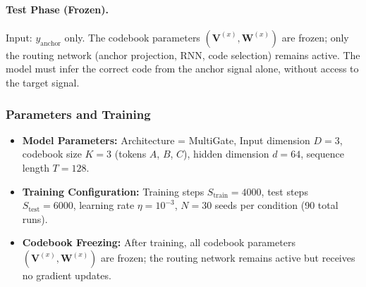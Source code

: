 \documentclass{article}
\begin{document}
\paragraph{Test Phase (Frozen).}
Input: $y_{\text{anchor}}$ only.
The codebook parameters $(\mathbf{V}^{(x)}, \mathbf{W}^{(x)})$ are frozen; only the routing network (anchor projection, RNN, code selection) remains active.
The model must infer the correct code from the anchor signal alone, without access to the target signal.

\subsubsection{Parameters and Training}
\begin{itemize}
    \item \textbf{Model Parameters:} Architecture = MultiGate, Input dimension $D=3$, codebook size $K=3$ (tokens $A$, $B$, $C$), hidden dimension $d=64$, sequence length $T=128$.
    \item \textbf{Training Configuration:} Training steps $S_{\text{train}} = 4000$, test steps $S_{\text{test}} = 6000$, learning rate $\eta = 10^{-3}$, $N = 30$ seeds per condition (90 total runs).
    \item \textbf{Codebook Freezing:} After training, all codebook parameters $(\mathbf{V}^{(x)}, \mathbf{W}^{(x)})$ are frozen; the routing network remains active but receives no gradient updates.
\end{itemize}
\end{document}
